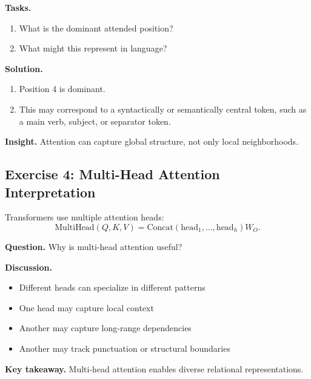 \medskip

\noindent
\textbf{Tasks.}
\begin{enumerate}
    \item What is the dominant attended position?
    \item What might this represent in language?
\end{enumerate}

\medskip

\noindent
\textbf{Solution.}

\begin{enumerate}
    \item Position 4 is dominant.

    \item This may correspond to a syntactically or semantically central token, such as a main verb, subject, or separator token.
\end{enumerate}

\medskip

\noindent
\textbf{Insight.}  
Attention can capture global structure, not only local neighborhoods.

\subsection{Exercise 4: Multi-Head Attention Interpretation}

Transformers use multiple attention heads:
\[
\text{MultiHead}(Q,K,V) = \text{Concat}(\text{head}_1, \dots, \text{head}_h)W_O.
\]

\medskip

\noindent
\textbf{Question.}  
Why is multi-head attention useful?

\medskip

\noindent
\textbf{Discussion.}

\begin{itemize}
    \item Different heads can specialize in different patterns
    \item One head may capture local context
    \item Another may capture long-range dependencies
    \item Another may track punctuation or structural boundaries
\end{itemize}

\medskip

\noindent
\textbf{Key takeaway.}  
Multi-head attention enables diverse relational representations.

